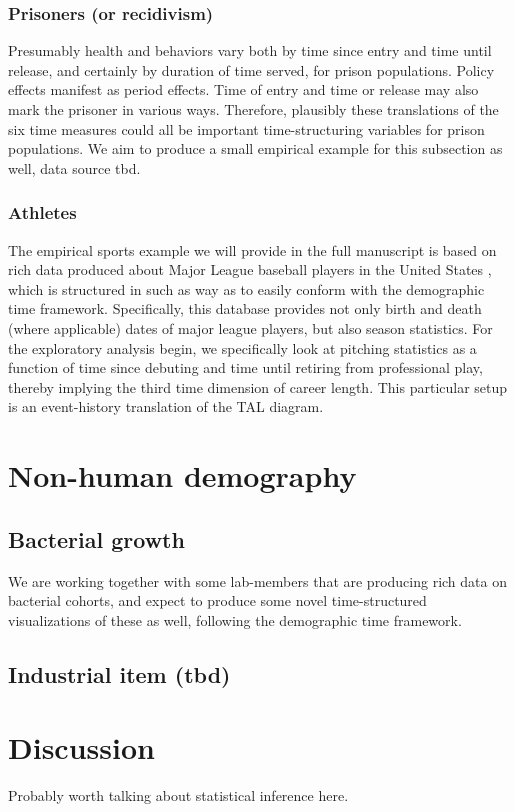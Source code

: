 \documentclass[11pt,oneside]{article} %
\begin{document}
		
		\subsubsection{Prisoners (or recidivism)}
		Presumably health and behaviors vary both by
		time since entry and time until release, and certainly by duration of
		time served, for prison populations. Policy effects manifest as period
		effects. Time of entry and time or release may also mark the prisoner in
		various ways. Therefore, plausibly these translations of the six time measures
		could all be important time-structuring variables for prison populations. We
		aim to produce a small empirical example for this subsection as well, data
		source tbd.
		
		\subsubsection{Athletes}
		The empirical sports example we will provide in the full manuscript is based
		on rich data produced about Major League baseball players in the United States
\citep{Lahman}, which is structured in such as way as to easily conform with the
demographic time framework. Specifically, this database provides not only birth
and death (where applicable) dates of major league players, but also season
statistics. For the exploratory analysis begin, we specifically look at
pitching statistics as a function of time since debuting and time until retiring
from professional play, thereby implying the third time dimension of career
length. This particular setup is an event-history translation of the TAL
diagram.
\section{Non-human demography}	
	\subsection{Bacterial growth}
	We are working together with some lab-members that are producing rich data on
	bacterial cohorts, and expect to produce some novel
	time-structured visualizations of these as well, following the demographic time
	framework.
		
	\subsection{Industrial item (tbd)}
	
\section{Discussion}
Probably worth talking about statistical inference here.



\singlespacing

   
\end{document}
